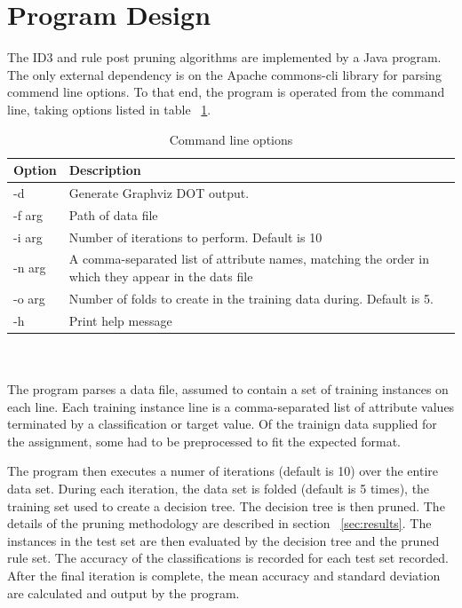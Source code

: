 \documentclass[10pt]{report}
\begin{document}
\section{Program Design}
The ID3 and rule post pruning algorithms are implemented by a Java
program. The only external dependency is on the Apache commons-cli
library for parsing commend line options. To that end, the program is
operated from the command line, taking options listed in table
~\ref{tab:commandline}.  
\\
\begin{table}[h]
  \centering
  \begin{tabular}{ |l|p{10cm}|} 
    \hline
    Option & Description \\ \hline
    -d          &  Generate Graphviz DOT output. \\ \hline
    -f \<arg\>  &  Path of data file \\ \hline
    -i \<arg\>  &  Number of iterations to perform. Default is 10 \\ \hline
    -n \<arg\>  &  A comma-separated list of attribute names, matching
    the order in which they appear in the dats file \\ \hline
    -o \<arg\>  &  Number of folds to create in the training data during. Default is 5. \\ \hline
    -h          &  Print help message \\ \hline
  \end{tabular}
  \caption{Command line options}
  \label{tab:commandline}
\end{table}
\\\\
The program parses a data file, assumed to contain a set of training
instances on each line. Each training instance line is a
comma-separated list of attribute values terminated by a
classification or target value. Of the trainign data supplied for the
assignment, some had to be preprocessed to fit the expected format.

The program then executes a numer of iterations (default is 10) over
the entire data set. During each iteration, the data set is folded
(default is 5 times), the training set used to create a decision
tree. The decision tree is then pruned. The details of the pruning
methodology are described in section ~\ref{sec:results}. The instances
in the test set are then evaluated by the decision tree and the pruned
rule set. The accuracy of the classifications is recorded for each
test set recorded. After the final iteration is complete, the mean
accuracy and standard deviation are calculated and output by the
program.
\end{document}
